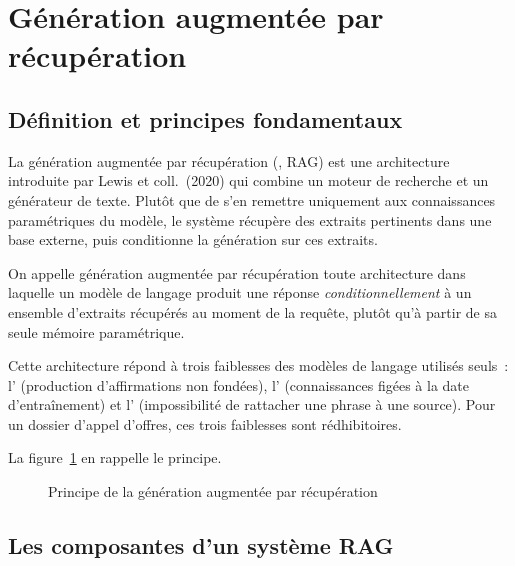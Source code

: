 \section{Génération augmentée par récupération}
\label{sec:ch1-rag}

\subsection{Définition et principes fondamentaux}

La génération augmentée par récupération (, RAG) est une architecture introduite par Lewis et coll.\ (2020)
qui combine un moteur de recherche et un générateur de texte. Plutôt que de
s'en remettre uniquement aux connaissances paramétriques du modèle, le système
récupère des extraits pertinents dans une base externe, puis conditionne la
génération sur ces extraits.

\begin{btpdef}
On appelle génération augmentée par récupération toute architecture dans
laquelle un modèle de langage produit une réponse \emph{conditionnellement} à
un ensemble d'extraits récupérés au moment de la requête, plutôt qu'à partir
de sa seule mémoire paramétrique.
\end{btpdef}

Cette architecture répond à trois faiblesses des modèles de langage utilisés
seuls~: l' (production d'affirmations non fondées),
l' (connaissances figées à la date d'entraînement) et
l' (impossibilité de rattacher une phrase à une
source). Pour un dossier d'appel d'offres, ces trois faiblesses sont
rédhibitoires.

La figure~\ref{fig:principe-rag} en rappelle le principe.

\begin{figure}[htbp]
  \centering
  \resizebox{\linewidth}{!}{}
  \caption{Principe de la génération augmentée par récupération}
  \label{fig:principe-rag}
\end{figure}

\subsection{Les composantes d'un système RAG}

